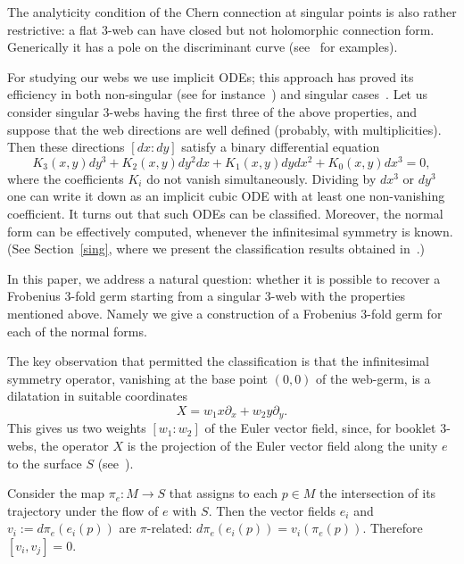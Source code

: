 \documentclass[pdftex]{sigma}
\begin{document}
The analyticity condition of the Chern connection at singular points is also rather restrictive: a f\/lat $3$-web can have closed but not holomorphic connection form. Generically it has a pole on the discriminant curve (see~\cite{Ac} for examples).

For studying our webs we use implicit ODEs; this approach has proved its ef\/f\/iciency
in both non-singular (see for instance~\cite{Ha}) and singular cases~\cite{Ac,Ai}.
Let us consider singular \mbox{$3$-webs} having the f\/irst three of the above properties,
and suppose that the web directions are well def\/ined (probably, with multiplicities).
Then these directions $[dx:dy]$ satisfy
a binary dif\/ferential equation
\begin{equation}\label{binary}
K_3(x,y)dy^3+K_2(x,y)dy^2dx+K_1(x,y)dydx^2+K_0(x,y)dx^3=0,
\end{equation}
where the coef\/f\/icients $K_i$ do not vanish simultaneously.
Dividing by $dx^3$ or $dy^3$ one can write it down as an implicit cubic ODE with at least one non-vanishing coef\/f\/icient. It turns out that such ODEs can be classif\/ied. Moreover, the normal form can be ef\/fectively computed, whenever the inf\/initesimal symmetry is known.
(See Section~\ref{sing}, where we present the classif\/ication results obtained in~\cite{Ac}.)


In this paper, we address a natural question: %
whether it is possible to recover a Frobenius $3$-fold germ starting from a singular $3$-web with the properties mentioned above.
Namely we give a construction of a Frobenius $3$-fold germ for each of the normal forms.

The key observation that permitted the classif\/ication is that the inf\/initesimal symmetry operator, vanishing at the base point $(0,0)$ of the web-germ, is a dilatation in suitable coordinates
\[
X=w_1x\partial_x+w_2y\partial_y.
\]
This gives us two weights $[w_1:w_2]$ of the Euler vector f\/ield, since, for booklet $3$-webs, the operator $X$ is the projection of the Euler vector f\/ield along the unity $e$ to the surface $S$ (see~\cite{Aw}).


Consider the map $\pi_e: M\to S$ that assigns to each $p\in M$ the intersection
of its trajectory under the f\/low of $e$ with $S$.
Then the vector f\/ields $e_i$ and $v_i:=d\pi_e(e_i(p))$ are $\pi$-related: $d\pi_e(e_i(p))=v_i(\pi_e(p))$.
Therefore $[v_i,v_j]=0$.
\end{document}
